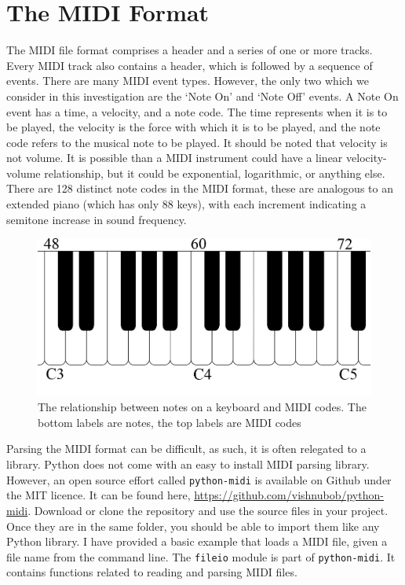 \documentclass[10pt]{book}
\begin{document}
\section{The MIDI Format}

The MIDI file format comprises a header and a series of one or more tracks. Every MIDI track also contains a header, which is followed by a sequence of events. There are many MIDI event types. However, the only two which we consider in this investigation are the `Note On' and `Note Off' events. A Note On event has a time, a velocity, and a note code. The time represents when it is to be played, the velocity is the force with which it is to be played, and the note code refers to the musical note to be played. It should be noted that velocity is not volume. It is possible than a MIDI instrument could have a linear velocity-volume relationship, but it could be exponential, logarithmic, or anything else. There are 128 distinct note codes in the MIDI format, these are analogous to an extended piano (which has only 88 keys), with each increment indicating a semitone increase in sound frequency.

\begin{figure}
	\centering
  \includegraphics[scale=0.3]{Keyslol}
  \caption{The relationship between notes on a keyboard and MIDI codes. The bottom labels are notes, the top labels are MIDI codes}\label{fig:keys}
\end{figure}

Parsing the MIDI format can be difficult, as such, it is often relegated to a library. Python does not come with an easy to install MIDI parsing library. However, an open source effort called \texttt{python-midi} is available on Github under the MIT licence. It can be found here, \url{https://github.com/vishnubob/python-midi}. Download or clone the repository and use the source files in your project. Once they are in the same folder, you should be able to import them like any Python library. I have provided a basic example that loads a MIDI file, given a file name from the command line. The \texttt{fileio} module is part of \texttt{python-midi}. It contains functions related to reading and parsing MIDI files.
\end{document}
